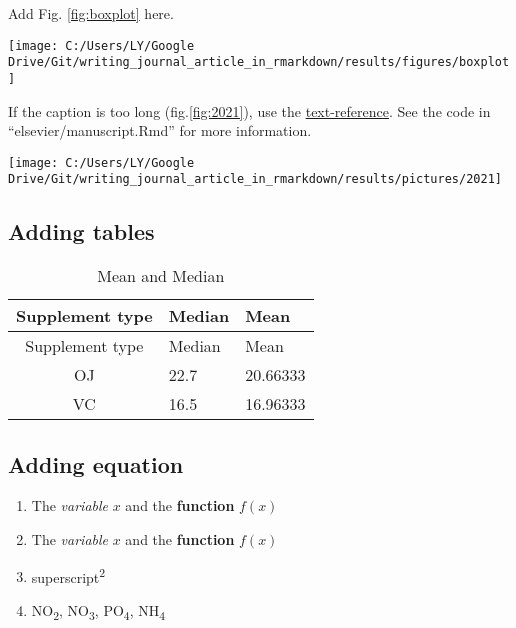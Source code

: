\documentclass[]{elsarticle} %
\providecommand{\tightlist}{%
  \setlength{\itemsep}{0pt}\setlength{\parskip}{0pt}}
\let\origfigure\figure
\let\endorigfigure\endfigure
\renewenvironment{figure}[1][2] {
    \expandafter\origfigure\expandafter[H]
} {
    \endorigfigure
}
\begin{document}
Add Fig. \ref{fig:boxplot} here.

\begin{figure}

{\centering \texttt{[image: C:/Users/LY/Google Drive/Git/writing\_journal\_article\_in\_rmarkdown/results/figures/boxplot]} 

}

\caption{A boxplot}\label{fig:boxplot}
\end{figure}

If the caption is too long (fig.\ref{fig:2021}), use the
\href{https://bookdown.org/yihui/rmarkdown/bookdown-markdown.html\#text-references}{text-reference}.
See the code in ``elsevier/manuscript.Rmd'' for more information.



\begin{figure}

{\centering \texttt{[image: C:/Users/LY/Google Drive/Git/writing\_journal\_article\_in\_rmarkdown/results/pictures/2021]} 

}

\caption{This is a very long caption}\label{fig:2021}
\end{figure}

\subsection{Adding tables}\label{table}

\begin{longtable}[]{@{}cll@{}}
\caption{\label{tab:unnamed-chunk-2}\label{tab:cooltable}Mean and
Median}\tabularnewline
\toprule
Supplement type & Median & Mean\tabularnewline
\midrule
\endfirsthead
\toprule
Supplement type & Median & Mean\tabularnewline
\midrule
\endhead
OJ & 22.7 & 20.66333\tabularnewline
VC & 16.5 & 16.96333\tabularnewline
\bottomrule
\end{longtable}

\subsection{Adding equation}\label{equation}

\begin{enumerate}
\def\labelenumi{\arabic{enumi}.}
\tightlist
\item
  The \emph{variable} \(x\) and the \textbf{function} \(f(x)\)
\item
  The \emph{variable} \(x\) and the \textbf{function} \(f(x)\)
\item
  superscript\textsuperscript{2}
\item
  NO\textsubscript{2}, NO\textsubscript{3}, PO\textsubscript{4},
  NH\textsubscript{4}
\end{enumerate}
\end{document}

